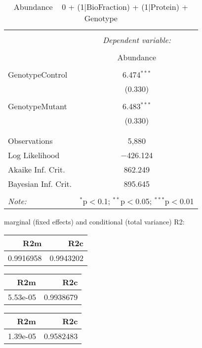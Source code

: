 \documentclass[11pt]{report}
\begin{document}
\begin{table}[!htbp] \centering 
  \caption{Abundance ~ 0 + (1|BioFraction) + (1|Protein) + Genotype} 
  \label{} 
\begin{tabular}{@{\extracolsep{5pt}}lc} 
\\[-1.8ex]\hline 
\hline \\[-1.8ex] 
 & \multicolumn{1}{c}{\textit{Dependent variable:}} \\ 
\cline{2-2} 
\\[-1.8ex] & Abundance \\ 
\hline \\[-1.8ex] 
 GenotypeControl & 6.474$^{***}$ \\ 
  & (0.330) \\ 
  & \\ 
 GenotypeMutant & 6.483$^{***}$ \\ 
  & (0.330) \\ 
  & \\ 
\hline \\[-1.8ex] 
Observations & 5,880 \\ 
Log Likelihood & $-$426.124 \\ 
Akaike Inf. Crit. & 862.249 \\ 
Bayesian Inf. Crit. & 895.645 \\ 
\hline 
\hline \\[-1.8ex] 
\textit{Note:}  & \multicolumn{1}{r}{$^{*}$p$<$0.1; $^{**}$p$<$0.05; $^{***}$p$<$0.01} \\ 
\end{tabular} 
\end{table} 
marginal (fixed effects) and conditional (total variance) R2:

\begin{tabular}{r|r}
\hline
R2m & R2c\\
\hline
0.9916958 & 0.9943202\\
\hline
\end{tabular}

\begin{tabular}{r|r}
\hline
R2m & R2c\\
\hline
5.53e-05 & 0.9938679\\
\hline
\end{tabular}

\begin{tabular}{r|r}
\hline
R2m & R2c\\
\hline
1.39e-05 & 0.9582483\\
\hline
\end{tabular}
\end{document}
